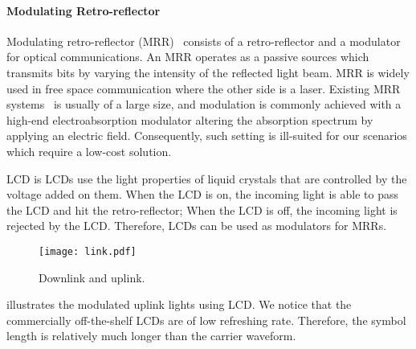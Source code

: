 \paragraph{Modulating Retro-reflector}
Modulating retro-reflector (MRR)~\cite{mrr} consists of a retro-reflector and a modulator for optical communications. An MRR operates as a passive sources which transmits bits by varying the intensity of the reflected light beam. MRR is widely used in free space communication where the other side is a laser. Existing MRR systems~\cite{expensive,expensive2} is usually of a large size, and modulation is commonly achieved with a high-end electroabsorption modulator altering the absorption spectrum by applying an electric field. Consequently, such setting is ill-suited for our scenarios which require a low-cost solution.

LCD is  LCDs use the light properties of liquid crystals that are controlled by the voltage added on them. When the LCD is on, the incoming light is able to pass the LCD and hit the retro-reflector; When the LCD is off, the incoming light is rejected by the LCD. Therefore, LCDs can be used as modulators for MRRs. 
\begin{figure}[th]
   \centering
   \texttt{[image: link.pdf]}
   \caption{Downlink and uplink.}
   \label{fig:link}
   \vskip -3mm
\end{figure}

 illustrates the modulated uplink lights using LCD. We notice that the commercially off-the-shelf LCDs are of low refreshing rate. Therefore, the symbol length is relatively much longer than the carrier waveform.


